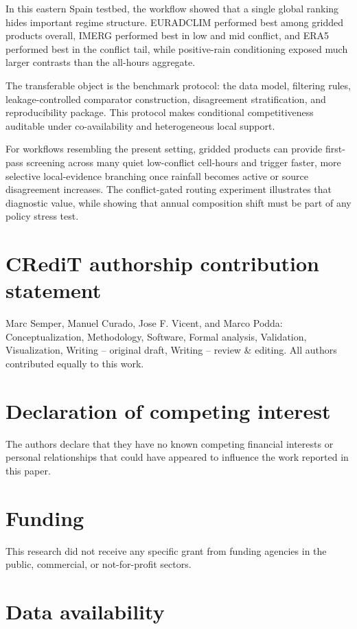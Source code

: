 \documentclass[preprint,12pt]{elsarticle}
\begin{document}
In this eastern Spain testbed, the workflow showed that a single global ranking hides important regime structure. EURADCLIM performed best among gridded products overall, IMERG performed best in low and mid conflict, and ERA5 performed best in the conflict tail, while positive-rain conditioning exposed much larger contrasts than the all-hours aggregate.

The transferable object is the benchmark protocol: the data model, filtering rules, leakage-controlled comparator construction, disagreement stratification, and reproducibility package. This protocol makes conditional competitiveness auditable under co-availability and heterogeneous local support.

For workflows resembling the present setting, gridded products can provide first-pass screening across many quiet low-conflict cell-hours and trigger faster, more selective local-evidence branching once rainfall becomes active or source disagreement increases. The conflict-gated routing experiment illustrates that diagnostic value, while showing that annual composition shift must be part of any policy stress test.

\section*{CRediT authorship contribution statement}

Marc Semper, Manuel Curado, Jose F. Vicent, and Marco Podda: Conceptualization, Methodology, Software, Formal analysis, Validation, Visualization, Writing -- original draft, Writing -- review \& editing. All authors contributed equally to this work.

\section*{Declaration of competing interest}

The authors declare that they have no known competing financial interests or personal relationships that could have appeared to influence the work reported in this paper.

\section*{Funding}

This research did not receive any specific grant from funding agencies in the public, commercial, or not-for-profit sectors.

\section*{Data availability}
\end{document}
